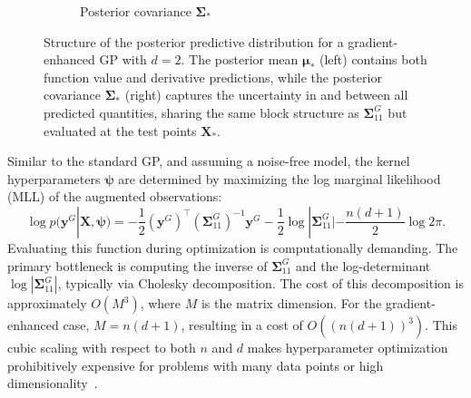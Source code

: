 \documentclass[12pt]{article}
\begin{document}
\begin{figure}[htbp]
\begin{subfigure}[t]{0.55\textwidth}
		\caption{Posterior covariance $\boldsymbol{\Sigma}_*$}
		\label{fig:gek_posterior_cov}
	\end{subfigure}
	
	\caption{Structure of the posterior predictive distribution for a gradient-enhanced GP with $d=2$. The posterior mean $\boldsymbol{\mu}_*$ (left) contains both function value and derivative predictions, while the posterior covariance $\boldsymbol{\Sigma}_*$ (right) captures the uncertainty in and between all predicted quantities, sharing the same block structure as $\boldsymbol{\Sigma}^{G}_{11}$ but evaluated at the test points $\mathbf{X}_*$.}
	\label{fig:gek_posterior}
\end{figure}
Similar to the standard GP, and assuming a noise-free model, the kernel hyperparameters $\boldsymbol{\psi}$ are determined by maximizing the log marginal likelihood (MLL) of the augmented observations:
\begin{equation}
	\label{eqn:gek_mll}
	\log p(\mathbf{y}^{G}|\mathbf{X}, \boldsymbol{\psi}) = -\frac{1}{2} \left(\mathbf{y}^{G}\right)^\top \left(\boldsymbol{\Sigma}^{G}_{11}\right)^{-1} \mathbf{y}^{G} - \frac{1}{2}\log|\boldsymbol{\Sigma}^{G}_{11}| - \frac{n(d+1)}{2}\log 2\pi.
\end{equation}
Evaluating this function during optimization is computationally demanding. The primary bottleneck is computing the inverse of $\boldsymbol{\Sigma}^{G}_{11}$ and the log-determinant $\log|\boldsymbol{\Sigma}^{G}_{11}|$, typically via Cholesky decomposition. The cost of this decomposition is approximately $O(M^3)$, where $M$ is the matrix dimension. For the gradient-enhanced case, $M = n(d+1)$, resulting in a cost of $O\left((n(d+1))^3\right)$. This cubic scaling with respect to both $n$ and $d$ makes hyperparameter optimization prohibitively expensive for problems with many data points or high dimensionality~\cite{FORRESTER200950, HeYouwei2023Aegk}.
\end{document}
